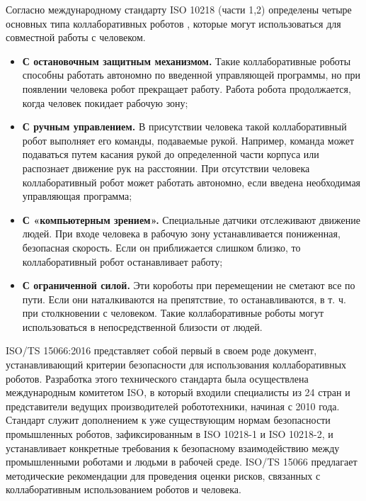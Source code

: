 Согласно международному стандарту ISO 10218 (части 1,2) \citep{iso1021812011} определены четыре основных типа коллаборативных роботов \citep{robotiqWhatDoes}, которые могут использоваться для совместной работы с человеком.
\begin{itemize}
	\item  \textbf{С остановочным защитным механизмом.} Такие коллаборативные роботы способны работать автономно по введенной управляющей программы, но при появлении человека робот прекращает работу. Работа робота продолжается, когда человек покидает рабочую зону;
	\item \textbf{С ручным управлением.} В присутствии человека такой коллаборативный робот выполняет его команды, подаваемые рукой. Например, команда может подаваться путем касания рукой до определенной части корпуса или распознает движение рук на расстоянии. При отсутствии человека коллаборативный робот может работать автономно, если введена необходимая управляющая программа;
	\item  \textbf{С «компьютерным зрением».} Специальные датчики отслеживают движение людей. При входе человека в рабочую зону устанавливается пониженная, безопасная скорость. Если он приближается слишком близко, то коллаборативный робот останавливает работу;
	\item \textbf{С ограниченной силой.} Эти короботы при перемещении не сметают все по пути. Если они наталкиваются на препятствие, то останавливаются, в т. ч. при столкновении с человеком. Такие коллаборативные роботы могут использоваться в непосредственной близости от людей.
\end{itemize}


ISO/TS 15066:2016 представляет собой первый в своем роде документ\citep{isoISOTS150662016}, устанавливающий критерии безопасности для использования коллаборативных роботов. Разработка этого технического стандарта была осуществлена международным комитетом ISO, в который входили специалисты из 24 стран и представители ведущих производителей робототехники, начиная с 2010 года. Стандарт служит дополнением к уже существующим нормам безопасности промышленных роботов, зафиксированным в ISO 10218-1 и ISO 10218-2, и устанавливает конкретные требования к безопасному взаимодействию между промышленными роботами и людьми в рабочей среде. ISO/TS 15066 предлагает методические рекомендации для проведения оценки рисков, связанных с коллаборативным использованием роботов и человека.


